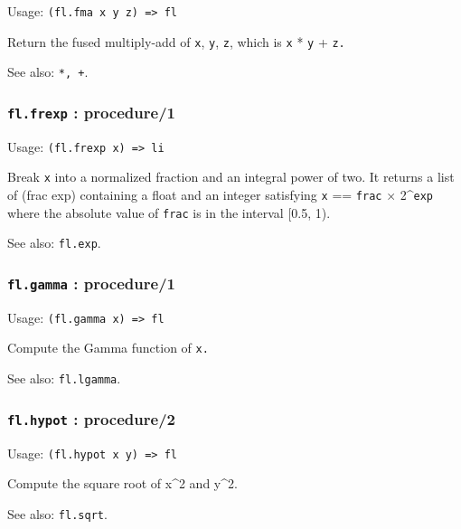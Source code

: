 \documentclass[
]{article}
\newcommand{\passthrough}[1]{#1}
\begin{document}
Usage: \passthrough{\lstinline!(fl.fma x y z) => fl!}

Return the fused multiply-add of \passthrough{\lstinline!x!},
\passthrough{\lstinline!y!}, \passthrough{\lstinline!z!}, which is
\passthrough{\lstinline!x!} * \passthrough{\lstinline!y!} +
\passthrough{\lstinline!z.!}

See also: \passthrough{\lstinline!*, +!}.

\hypertarget{fl.frexp-procedure1}{%
\subsubsection{\texorpdfstring{\texttt{fl.frexp} :
procedure/1}{fl.frexp : procedure/1}}\label{fl.frexp-procedure1}}

Usage: \passthrough{\lstinline!(fl.frexp x) => li!}

Break \passthrough{\lstinline!x!} into a normalized fraction and an
integral power of two. It returns a list of (frac exp) containing a
float and an integer satisfying \passthrough{\lstinline!x!} ==
\passthrough{\lstinline!frac!} × 2\^{}\passthrough{\lstinline!exp!}
where the absolute value of \passthrough{\lstinline!frac!} is in the
interval {[}0.5, 1).

See also: \passthrough{\lstinline!fl.exp!}.

\hypertarget{fl.gamma-procedure1}{%
\subsubsection{\texorpdfstring{\texttt{fl.gamma} :
procedure/1}{fl.gamma : procedure/1}}\label{fl.gamma-procedure1}}

Usage: \passthrough{\lstinline!(fl.gamma x) => fl!}

Compute the Gamma function of \passthrough{\lstinline!x.!}

See also: \passthrough{\lstinline!fl.lgamma!}.

\hypertarget{fl.hypot-procedure2}{%
\subsubsection{\texorpdfstring{\texttt{fl.hypot} :
procedure/2}{fl.hypot : procedure/2}}\label{fl.hypot-procedure2}}

Usage: \passthrough{\lstinline!(fl.hypot x y) => fl!}

Compute the square root of x\^{}2 and y\^{}2.

See also: \passthrough{\lstinline!fl.sqrt!}.
\end{document}
